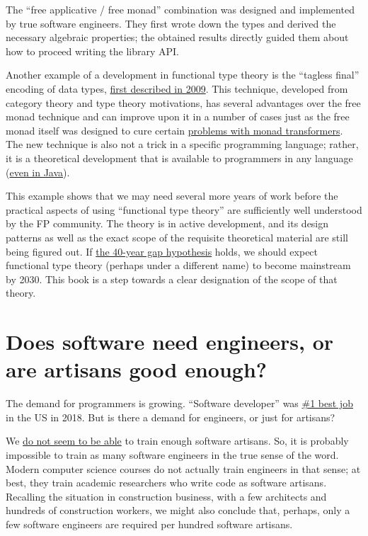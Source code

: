 The ``free applicative / free monad'' combination was designed and
implemented by true software engineers. They first wrote down the
types and derived the necessary algebraic properties; the obtained
results directly guided them about how to proceed writing the library
API.

Another example of a development in functional type theory is the
 ``tagless final'' encoding of data types, \href{http://okmij.org/ftp/tagless-final/index.html}{first described in 2009}.
This technique, developed from category theory and type theory motivations,
has several advantages over the free monad technique and can improve
upon it in a number of cases \textendash{} just as the free monad
itself was designed to cure certain \href{http://blog.ezyang.com/2013/09/if-youre-using-lift-youre-doing-it-wrong-probably/}{problems with monad transformers}.
The new technique is also not a trick in a specific programming language;
rather, it is a theoretical development that is available to programmers
in any language (\href{https://oleksandrmanzyuk.wordpress.com/2014/06/18/from-object-algebras-to-finally-tagless-interpreters-2/}{even in Java}).

This example shows that we may need several more years of work before
the practical aspects of using ``functional type theory'' are sufficiently
well understood by the FP community. The theory is in active development,
and its design patterns \textendash{} as well as the exact scope of
the requisite theoretical material \textendash{} are still being figured
out. If \href{https://www.linkedin.com/pulse/40-year-gap-what-has-academic-computer-science-ever-done-winitzki/}{the 40-year gap hypothesis}
holds, we should expect functional type theory (perhaps under a different
name) to become mainstream by 2030. This book is a step towards a
clear designation of the scope of that theory.

\section{Does software need engineers, or are artisans good enough? }

The demand for programmers is growing. ``Software developer'' was
\href{https://money.usnews.com/money/careers/articles/how-us-news-ranks-the-best-jobs}{\#1 best job}
in the US in 2018. But is there a demand for engineers, or just for
artisans?

We \href{https://www.mendix.com/blog/5-stats-illustrating-the-developer-shortage-facing-enterprise-organizations/}{do not seem to be able}
to train enough software artisans. So, it is probably impossible to
train as many software engineers in the true sense of the word. Modern
computer science courses do not actually train engineers in that sense;
at best, they train academic researchers who write code as software
artisans. Recalling the situation in construction business, with a
few architects and hundreds of construction workers, we might also
conclude that, perhaps, only a few software engineers are required
per hundred software artisans.

